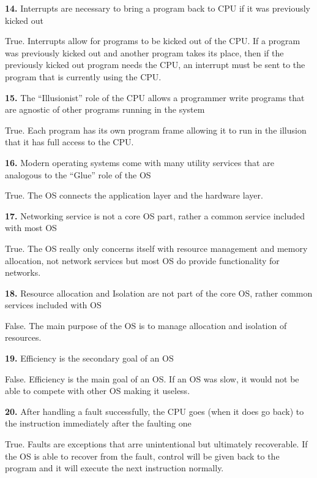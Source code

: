 \documentclass[12pt]{article}
\begin{document}
\bigskip

{\bf 14.} Interrupts are necessary to bring a program back to CPU if it was previously kicked out

True. Interrupts allow for programs to be kicked out of the CPU. If a program was previously kicked out and another program takes its place, then if the previously kicked out program needs the CPU, an interrupt must be sent to the program that is currently using the CPU. 

\bigskip

{\bf 15.} The “Illusionist” role of the CPU allows a programmer write programs that are agnostic of
other programs running in the system

True. Each program has its own program frame allowing it to run in the illusion that it has full access to the CPU. 

\bigskip

{\bf 16.} Modern operating systems come with many utility services that are analogous to the “Glue”
role of the OS

True. The OS connects the application layer and the hardware layer. 

\bigskip

{\bf 17.} Networking service is not a core OS part, rather a common service included with most OS

True. The OS really only concerns itself with resource management and memory allocation, not network services but most OS do provide functionality for networks. 

\bigskip

{\bf 18.} Resource allocation and Isolation are not part of the core OS, rather common services
included with OS

False. The main purpose of the OS is to manage allocation and isolation of resources. 

\bigskip

{\bf 19.} Efficiency is the secondary goal of an OS

False. Efficiency is the main goal of an OS. If an OS was slow, it would not be able to compete with other OS making it useless. 

\bigskip

{\bf 20.} After handling a fault successfully, the CPU goes (when it does go back) to the instruction
immediately after the faulting one

True. Faults are exceptions that arre unintentional but ultimately recoverable. If the OS is able to recover from the fault, control will be given back to the program and it will execute the next instruction normally. 
\end{document}
